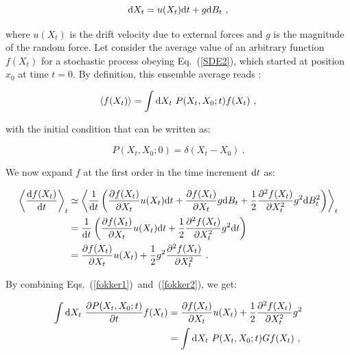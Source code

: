 \begin{equation}
	\textnormal{d}X_t = u(X_t) \mathrm{d}t + g\textnormal{d}B_t ~,
	\label{SDE2}
\end{equation}

where $u(X_t)$ is the drift velocity due to external forces and $g$ is the magnitude of the random force. Let consider the average value of an arbitrary function $f(X_t)$ for a stochastic process obeying Eq.~(\ref{SDE2}), which started at position $x_0$ at time $t=0$. By definition, this ensemble average reads \cite{le_bellac_equilibrium_2004}:

\begin{equation}
	\langle f(X_t) \rangle = \int \textnormal{d}X_t ~ P(X_t, X_0 ; t) f(X_t) ~,
	\label{fokker1}
\end{equation}

with the initial condition that can be written as:

\begin{equation}
P(X_t, X_0; 0) = \delta (X_t - X_0) ~.
\end{equation}

We now expand $f$ at the first order in the time increment $\textnormal{d}t$ as:

\begin{equation}
	\begin{aligned}
		\left\langle \frac{\textnormal{d}f(X_t)}{\textnormal{d}t} \right\rangle_t  &\simeq \left\langle \frac{1}{\textnormal{d}t} \left( \frac{\partial f(X_t)}{\partial X_t} u(X_t) \textnormal{d}t + \frac{\partial f(X_t)}{\partial X_t} g \textnormal{d}B_t + \frac{1}{2} \frac{\partial^2 f(X_t)}{\partial X_t^2} g^2  \textnormal{d}B_t^2   \right) \right\rangle_t \\
		& =  \frac{1}{\textnormal{d}t} \left( \frac{\partial f(X_t)}{\partial X_t} u(X_t) \textnormal{d}t + \frac{1}{2} \frac{\partial^2 f(X_t)}{\partial X_t^2} g^2 \textnormal{d}t \right) \\
		& = \frac{\partial f(X_t)}{\partial X_t} u(X_t) + \frac{1}{2} g^2 \frac{\partial^2 f(X_t)}{\partial X_t^2}   ~.
	\end{aligned}
	\label{fokker2}
\end{equation}

By combining Eqs.~(\ref{fokker1})~and~(\ref{fokker2}), we get:

\begin{equation}
	\begin{aligned}
		\int \textnormal{d} X_t ~\frac{\partial P(X_t, X_0 ; t) }{\partial t} f(X_t)
		& =  \frac{\partial f(X_t)}{\partial X_t} u(X_t) + \frac{1}{2} \frac{\partial^2 f(X_t)}{\partial X_t^2} g^2 \\
		& = \int \textnormal{d}X_t ~ P(X_t, X_0 ; t) G f(X_t) ~,
	\end{aligned}
\end{equation}

